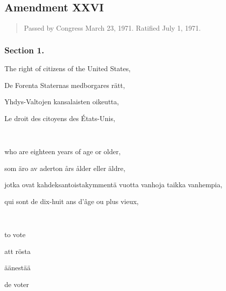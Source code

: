 \documentclass[a4,landscape,12pt]{article}
\begin{document}
\subsection*{Amendment XXVI}
\begin{quote}\small
	Passed by Congress March 23, 1971. Ratified July 1, 1971.
\end{quote}
\subsubsection*{Section 1.}
\begin{minipage}[t]{0.22\textwidth}
	The right of citizens of the United States,
\end{minipage}\textwidth
\begin{minipage}[t]{0.22\textwidth}
	De Forenta Staternas medborgares rätt,
\end{minipage}\textwidth
\begin{minipage}[t]{0.22\textwidth}
	Yhdys-Valtojen kansalaisten oikeutta,
\end{minipage}\textwidth
\begin{minipage}[t]{0.22\textwidth}
	Le droit des citoyens des États-Unis,
\end{minipage}

~

\begin{minipage}[t]{0.22\textwidth}
who are eighteen years of age or older,
\end{minipage}\textwidth
\begin{minipage}[t]{0.22\textwidth}
som äro av aderton års ålder eller äldre,
\end{minipage}\textwidth
\begin{minipage}[t]{0.22\textwidth}
jotka ovat kahdeksantoistakymmentä vuotta vanhoja taikka vanhempia,
\end{minipage}\textwidth
\begin{minipage}[t]{0.22\textwidth}
	qui sont de dix-huit ans d'âge ou plus vieux,
\end{minipage}

~

\begin{minipage}[t]{0.22\textwidth}
to vote
\end{minipage}\textwidth
\begin{minipage}[t]{0.22\textwidth}
att rösta
\end{minipage}\textwidth
\begin{minipage}[t]{0.22\textwidth}
äänestää
\end{minipage}\textwidth
\begin{minipage}[t]{0.22\textwidth}
de voter
\end{minipage}
\end{document}
